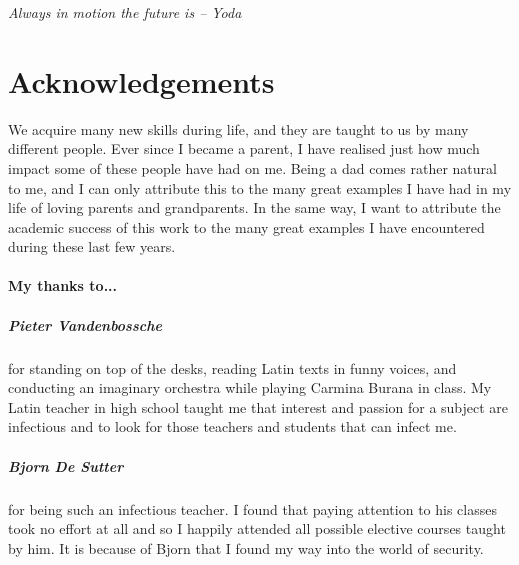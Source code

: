 \thispagestyle{empty}

\vspace*{\fill}
\begin{center}
\begin{minipage}{.6\textwidth}
\emph{Always in motion the future is -- Yoda}
\end{minipage}
\end{center}
\vfill %


\cleardoublepage

\chapter*{Acknowledgements}
\label{ch:ack}

We acquire many new skills during life, and they are taught to us by many different people.
Ever since I became a parent, I have realised just how much impact some of these people have had on me.
Being a dad comes rather natural to me, and I can only attribute this to the many great examples I have had in my life of loving parents and grandparents.
In the same way, I want to attribute the academic success of this work to the many great examples I have encountered during these last few years.

\subsubsection*{My thanks to...}

\paragraph{Pieter Vandenbossche}
for standing on top of the desks, reading Latin texts in funny voices, and conducting an imaginary orchestra while playing Carmina Burana in class.
My Latin teacher in high school taught me that interest and passion for a subject are infectious and to look for those teachers and students that can infect me.

\paragraph{Bjorn De Sutter}
for being such an infectious teacher.
I found that paying attention to his classes took no effort at all and so I happily attended all possible elective courses taught by him.
It is because of Bjorn that I found my way into the world of security.

